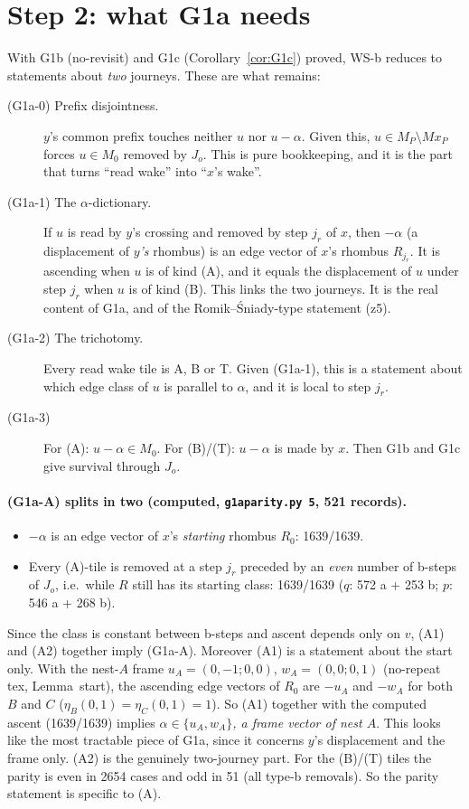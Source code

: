 \documentclass[11pt]{article}
\theoremstyle{definition}\newtheorem{definition}[theorem]{Definition}\newtheorem{remark}[theorem]{Remark}
\begin{document}
\section{Step 2: what G1a needs}\label{sec:G1a}
With G1b (no-revisit) and G1c (Corollary~\ref{cor:G1c}) proved, WS-b reduces to statements about \emph{two} journeys. These are what remains:
\begin{description}
\item[(G1a-0) Prefix disjointness.] $y$'s common prefix touches neither $u$ nor $u-\alpha$. Given this, $u\in M_P\setminus Mx_P$ forces $u\in M_0$ removed by $J_o$. This is pure bookkeeping, and it is the part that turns ``read wake'' into ``$x$'s wake''.
\item[(G1a-1) The $\alpha$-dictionary.] If $u$ is read by $y$'s crossing and removed by step $j_r$ of $x$, then $-\alpha$ (a displacement of \emph{$y$'s} rhombus) is an edge vector of $x$'s rhombus $R_{j_r}$. It is ascending when $u$ is of kind (A), and it equals the displacement of $u$ under step $j_r$ when $u$ is of kind (B).
This links the two journeys. It is the real content of G1a, and of the Romik--\'Sniady-type statement (z5).
\item[(G1a-2) The trichotomy.] Every read wake tile is A, B or T. Given (G1a-1), this is a statement about which edge class of $u$ is parallel to $\alpha$, and it is local to step $j_r$.
\item[(G1a-3)] For (A): $u-\alpha\in M_0$. For (B)/(T): $u-\alpha$ is made by $x$. Then G1b and G1c give survival through $J_o$.
\end{description}
\paragraph{(G1a-A) splits in two (computed, \texttt{g1aparity.py 5}, 521 records).}
\begin{itemize}
\item[(A1)] $-\alpha$ is an edge vector of $x$'s \emph{starting} rhombus $R_0$: 1639/1639.
\item[(A2)] Every (A)-tile is removed at a step $j_r$ preceded by an \emph{even} number of b-steps of $J_o$, i.e.\ while $R$ still has its starting class: 1639/1639 ($q$: 572 a + 253 b; $p$: 546 a + 268 b).
\end{itemize}
Since the class is constant between b-steps and ascent depends only on $v$, (A1) and (A2) together imply (G1a-A).
Moreover (A1) is a statement about the start only. With the nest-$A$ frame $u_A=(0,-1;0,0)$, $w_A=(0,0;0,1)$ (no-repeat tex, Lemma~start), the ascending edge vectors of $R_0$ are $-u_A$ and $-w_A$ for both $B$ and $C$ ($\eta_B(0,1)=\eta_C(0,1)=1$). So (A1) together with the computed ascent (1639/1639) implies \emph{$\alpha\in\{u_A,w_A\}$, a frame vector of nest $A$}. This looks like the most tractable piece of G1a, since it concerns $y$'s displacement and the frame only. (A2) is the genuinely two-journey part.
For the (B)/(T) tiles the parity is even in 2654 cases and odd in 51 (all type-b removals). So the parity statement is specific to (A).
\end{document}

